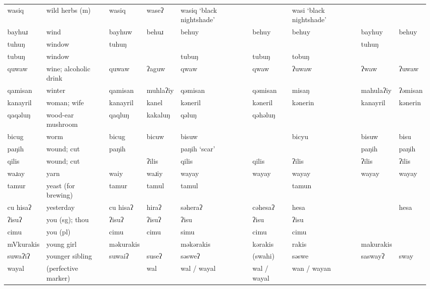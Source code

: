 \begin{landscape}
\begin{longtable}{*{9}{>{\raggedright\arraybackslash}p{}}}
\text{*}wasiq        & wild herbs (m) & wasiq & waseʔ & wasiq `black nightshade' &  & wasi `black nightshade' &  & \\
\text{*}bayhuɹ       & wind & bayhuw & behuɹ & behuy & behuy & behuy & bayhuy & behuy\\
\text{*}tuhuŋ        & window & tuhuŋ &  &  &  &  & tuhuŋ & \\
\text{*}tubuŋ        & window &  &  & tubuŋ & tubuŋ & tobuŋ &  & \\
\text{*}quwaw        & wine; alcoholic drink & quwaw & ʔaguw & qwaw & qwaw & ʔuwaw & ʔwaw & ʔuwaw\\
\text{*}qamisan      & winter & qamisan & muhlaʔiy & qəmisan & qəmisan & misaŋ & mahulaʔiy & ʔəmisan\\
\text{*}kanayril     & woman; wife & kanayril & kanel & kəneril & kəneril & kənerin & kanayril & kənerin\\
\text{*}qaqəluŋ      & wood-ear mushroom & qaqluŋ & kakaluŋ & qəluŋ & qəhəluŋ &  &  & \\
\text{*}bicug        & worm & bicug & bicuw & bisuw &  & bicyu & bisuw & bisu\\
\text{*}paŋih        & wound; cut & paŋih &  & paŋih `scar' &  &  & paŋih & paŋih\\
\text{*}qilis        & wound; cut &  & ʔilis & qilis & qilis & ʔilis & ʔilis & ʔilis\\
\text{*}waɹay        & yarn & waiy & waɹiy & wayay & wayay & wayay & wayay & wayay\\
\text{*}tamur        & yeast (for brewing) & tamur & tamul & tamul &  & tamun &  & \\
\text{*}cu hisaʔ     & yesterday & cu hisaʔ & hiraʔ & səheraʔ & cəhesaʔ & hesa &  & hesa\\
\text{*}ʔisuʔ        & you (sg); thou & ʔisuʔ & ʔisuʔ & ʔisu & ʔisu & ʔisu &  & \\
\text{*}cimu         & you (pl) & cimu & cimu & simu & cimu & cimu &  & \\
\text{*}mVkurakis    & young girl & məkurakis &  & məkərakis & kərakis & rakis & makurakis & \\
\text{*}suwaʔiʔ      & younger sibling & suwaiʔ & suseʔ & səsweʔ & (swahi) & səswe & saswayʔ & sway\\
\text{*}wayal        & (perfective marker) &  & wal & wal / wayal & wal / wayal & wan / wayan &  & \\
\end{longtable}

\end{landscape}
